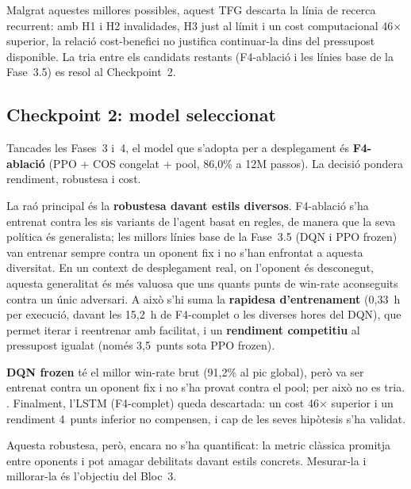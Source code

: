Malgrat aquestes millores possibles, aquest \ac{TFG} descarta la línia de recerca
recurrent: amb H1 i H2 invalidades, H3 just al límit i un cost computacional 46$\times$
superior, la relació cost-benefici no justifica continuar-la dins del pressupost disponible.
La tria entre els candidats restants (F4-ablació i les línies base de la Fase~3.5) es
resol al Checkpoint~2.

\subsection{Checkpoint 2: model seleccionat}
\label{sec:checkpoint2}

Tancades les Fases~3 i~4, el model que s'adopta per a desplegament és \textbf{F4-ablació}
(PPO + COS congelat + pool, 86{,}0\% a 12M passos). La decisió pondera rendiment, robustesa
i cost.

La raó principal és la \textbf{robustesa davant estils diversos}. F4-ablació s'ha entrenat
contra les sis variants de l'agent basat en regles, de manera que la seva política és
generalista; les millors línies base de la Fase~3.5 (DQN i PPO frozen) van entrenar sempre
contra un oponent fix i no s'han enfrontat a aquesta diversitat. En un context de
desplegament real, on l'oponent és desconegut, aquesta generalitat és més valuosa que uns
quants punts de win-rate aconseguits contra un únic adversari. A això s'hi suma la
\textbf{rapidesa d'entrenament} (0{,}33~h per execució, davant les 15{,}2~h de F4-complet o
les diverses hores del DQN), que permet iterar i reentrenar amb facilitat, i un
\textbf{rendiment competitiu} al pressupost igualat (només 3{,}5~punts sota PPO frozen).

\textbf{DQN frozen} té el millor win-rate brut (91{,}2\% al pic global), però va ser entrenat
contra un oponent fix i no s'ha provat contra el pool; per això no es tria. . Finalment, l'\ac{LSTM} (F4-complet) queda
descartada: un cost 46$\times$ superior i un rendiment 4~punts inferior no compensen, i cap
de les seves hipòtesis s'ha validat.

Aquesta robustesa, però, encara no s'ha quantificat: la \(\text{metric}\) clàssica
promitja entre oponents i pot amagar debilitats davant estils concrets. Mesurar-la i
millorar-la és l'objectiu del Bloc~3.
